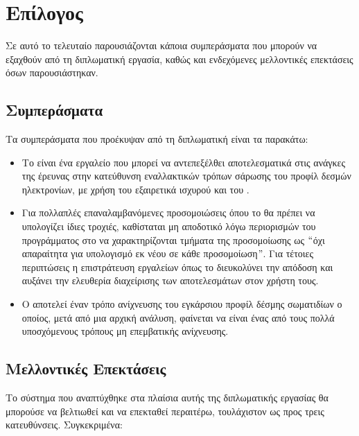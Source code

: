 \chapter{Επίλογος}
Σε αυτό το τελευταίο παρουσιάζονται κάποια συμπεράσματα που μπορούν να εξαχθούν από τη διπλωματική εργασία, καθώς και ενδεχόμενες μελλοντικές επεκτάσεις όσων παρουσιάστηκαν.

\section{Συμπεράσματα}
Τα συμπεράσματα που προέκυψαν από τη διπλωματική είναι τα παρακάτω:
\begin{itemize}
\item Το  είναι ένα εργαλείο που μπορεί να αντεπεξέλθει αποτελεσματικά στις ανάγκες της έρευνας στην κατεύθυνση εναλλακτικών τρόπων σάρωσης του προφίλ δεσμών ηλεκτρονίων, με χρήση του εξαιρετικά ισχυρού  και του .
\item Για πολλαπλές επαναλαμβανόμενες προσομοιώσεις όπου το  θα πρέπει να υπολογίζει ίδιες τροχιές, καθίσταται μη αποδοτικό λόγω περιορισμών του προγράμματος στο να χαρακτηρίζονται τμήματα της προσομοίωσης ως $``$όχι απαραίτητα για υπολογισμό εκ νέου σε κάθε προσομοίωση$"$. 
Για τέτοιες περιπτώσεις η επιστράτευση εργαλείων όπως το  διευκολύνει την απόδοση και αυξάνει την ελευθερία διαχείρισης των αποτελεσμάτων στον χρήστη τους.
\item Ο  αποτελεί έναν τρόπο ανίχνευσης του εγκάρσιου προφίλ δέσμης σωματιδίων ο οποίος, μετά από μια αρχική ανάλυση, φαίνεται να είναι ένας από τους πολλά υποσχόμενους τρόπους μη επεμβατικής ανίχνευσης.
\end{itemize}

\section{Μελλοντικές Επεκτάσεις}
Το σύστημα που αναπτύχθηκε στα πλαίσια αυτής της διπλωματικής εργασίας θα μπορούσε να βελτιωθεί και να επεκταθεί περαιτέρω,
τουλάχιστον ως προς τρεις κατευθύνσεις. 
Συγκεκριμένα:

